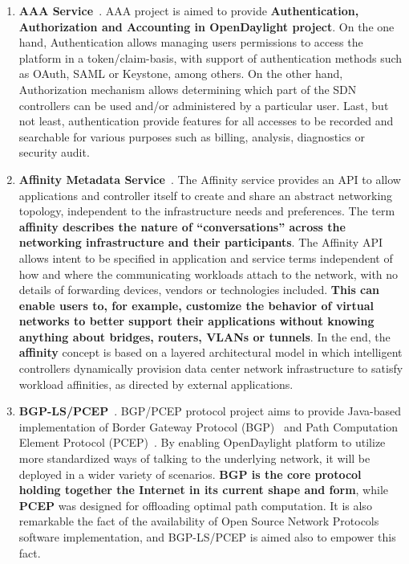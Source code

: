 \documentclass[a4paper, 12pt]{book}
\begin{document}
\begin{enumerate}
\item{\textbf{AAA Service}}~\cite{OpenDaylightWikiAAA}. AAA project is aimed to provide \textbf{Authentication, Authorization and Accounting in OpenDaylight project}. On the one hand, Authentication allows managing users permissions to access the platform in a token/claim-basis, with support of authentication methods such as OAuth, SAML or Keystone, among others. On the other hand, Authorization mechanism allows determining which part of the SDN controllers can be used and/or administered by a particular user. Last, but not least, authentication provide features for all accesses to be recorded and searchable for various purposes such as billing, analysis, diagnostics or security audit.
\item{\textbf{Affinity Metadata Service}}~\cite{OpenDaylightWikiAffinity}. The Affinity service provides an API to allow applications and controller itself to create and share an abstract networking topology, independent to the infrastructure needs and preferences. The term \textbf{affinity describes the nature of “conversations” across the networking infrastructure and their participants}. The Affinity API allows intent to be specified in application and service terms independent of how and where the communicating workloads attach to the network, with no details of forwarding devices, vendors or technologies included. \textbf{This can enable users to, for example, customize the behavior of virtual networks to better support their applications without knowing anything about bridges, routers, VLANs or tunnels}. In the end, the \textbf{affinity} concept is based on a layered architectural model in which intelligent controllers dynamically provision data center network infrastructure to satisfy workload affinities, as directed by external applications.
\item{\textbf{BGP-LS/PCEP}}~\cite{OpenDaylightWikiBGP}. BGP/PCEP protocol project aims to provide Java-based implementation of Border Gateway Protocol (BGP)~\cite{BGP} and Path Computation Element Protocol (PCEP)~\cite{PCEP}. By enabling OpenDaylight platform to utilize more standardized ways of talking to the underlying network, it will be deployed in a wider variety of scenarios. \textbf{BGP is the core protocol holding together the Internet in its current shape and form}, while \textbf{PCEP} was designed for offloading optimal path computation. It is also remarkable the fact of the availability of Open Source Network Protocols software implementation, and BGP-LS/PCEP is aimed also to empower this fact.

\end{enumerate}
\end{document}
